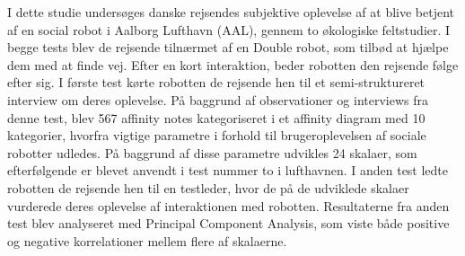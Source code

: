 I dette studie undersøges danske rejsendes subjektive oplevelse af at blive betjent af en social robot i Aalborg Lufthavn (AAL), gennem to økologiske feltstudier. I begge tests blev de rejsende tilnærmet af en Double robot, som tilbød at hjælpe dem med at finde vej. Efter en kort interaktion, beder robotten den rejsende følge efter sig. I første test kørte robotten de rejsende hen til et semi-struktureret interview om deres oplevelse. På baggrund af observationer og interviews fra denne test, blev 567 affinity notes kategoriseret i et affinity diagram med 10 kategorier, hvorfra vigtige parametre i forhold til brugeroplevelsen af sociale robotter udledes. På baggrund af disse parametre udvikles 24 skalaer, som efterfølgende er blevet anvendt i test nummer to i lufthavnen. I anden test ledte robotten de rejsende hen til en testleder, hvor de på de udviklede skalaer vurderede deres oplevelse af interaktionen med robotten. Resultaterne fra anden test blev analyseret med Principal Component Analysis, som viste både positive og negative korrelationer mellem flere af skalaerne.